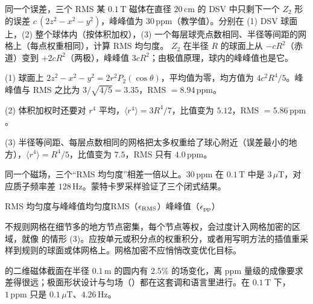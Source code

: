 \begin{example}[label=ex:mri-homogeneity]{同一个误差，三个 RMS}
某 $0.1\,\mathrm T$ 磁体在直径 $20\,\mathrm{cm}$ 的 DSV 中只剩下一个 $Z_2$ 形的误差 $c\,(2z^2-x^2-y^2)$，峰峰值为 $30\,\mathrm{ppm}$（教学值）。分别在 (1) DSV 球面上，(2) 整个球体内（按体积加权），(3) 一个每层球壳点数相同、半径等间距的网格上（每点权重相同），计算 RMS 均匀度。
\solution
$Z_2$ 在半径 $R$ 的球面上从 $-cR^2$（赤道）变到 $+2cR^2$（两极），峰峰值 $3cR^2$；由极值原理，球内的峰峰值也是它。

(1) 球面上 $2z^2-x^2-y^2=2r^2P_2(\cos\theta)$，平均值为零，均方值为 $4c^2R^4/5$。峰峰值与 RMS 之比为 $3/\sqrt{4/5}=3.35$，RMS $=8.94\,\mathrm{ppm}$。

(2) 体积加权时还要对 $r^4$ 平均，$\langle r^4\rangle=3R^4/7$，比值变为 $5.12$，RMS $=5.86\,\mathrm{ppm}$。

(3) 半径等间距、每层点数相同的网格把太多权重给了球心附近（误差最小的地方），$\langle r^4\rangle=R^4/5$，比值变为 $7.5$，RMS 只有 $4.0\,\mathrm{ppm}$。

同一个磁场，三个“RMS 均匀度”相差一倍以上。$30\,\mathrm{ppm}$ 在 $0.1\,\mathrm T$ 中是 $3\,\mu\mathrm T$，对应质子频率差 $128\,\mathrm{Hz}$。蒙特卡罗采样验证了三个闭式结果。
\end{example}

\begin{compare}{RMS 均匀度与峰峰值均匀度}{RMS（$\epsilon_{\rm RMS}$）}{峰峰值（$\epsilon_{\rm pp}$）}
\end{compare}

\begin{pitfall}
不规则网格在细节多的地方节点密集，每个节点等权，会过度计入网格加密的区域，就像 的情形 (3)。应按单元或积分点的权重积分，或者用写明方法的插值重采样到规则的球面或体网格上。网格加密不应悄悄改变优化目标。
\end{pitfall}

 的二维磁体截面在半径 $0.1\,\mathrm m$ 的圆内有 $2.5\%$ 的场变化，离 ppm 量级的成像要求差得很远；极面形状设计与匀场（）都在这套调和语言里进行。在 $0.1\,\mathrm T$ 下，$1\,\mathrm{ppm}$ 只是 $0.1\,\mu\mathrm T$、$4.26\,\mathrm{Hz}$。

